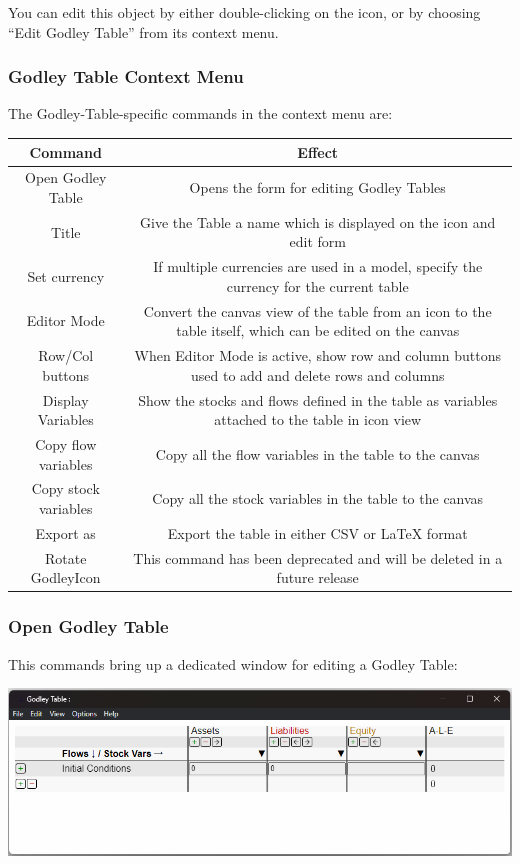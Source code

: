 You can edit this object by either double-clicking on the icon, or
by choosing ``Edit Godley Table'' from its context menu.

\subsubsection{Godley Table Context Menu}

The Godley-Table-specific commands in the context menu are:

\begin{tabular}{|c|c|}
\hline 
Command & Effect\tabularnewline
\hline 
\hline 
Open Godley Table & Opens the form for editing Godley Tables\tabularnewline
\hline 
Title & Give the Table a name which is displayed on the icon and edit form\tabularnewline
\hline 
Set currency & If multiple currencies are used in a model, specify the currency for
the current table\tabularnewline
\hline 
Editor Mode & Convert the canvas view of the table from an icon to the table itself,
which can be edited on the canvas\tabularnewline
\hline 
Row/Col buttons & When Editor Mode is active, show row and column buttons used to add
and delete rows and columns\tabularnewline
\hline 
Display Variables & Show the stocks and flows defined in the table as variables attached
to the table in icon view\tabularnewline
\hline 
Copy flow variables & Copy all the flow variables in the table to the canvas\tabularnewline
\hline 
Copy stock variables & Copy all the stock variables in the table to the canvas\tabularnewline
\hline 
Export as & Export the table in either CSV or LaTeX format\tabularnewline
\hline 
Rotate GodleyIcon & This command has been deprecated and will be deleted in a future release\tabularnewline
\hline 
\end{tabular}

\subsubsection{Open Godley Table}

This commands bring up a dedicated window for editing a Godley Table:

\includegraphics{images/GodleyTableEditWindow}

